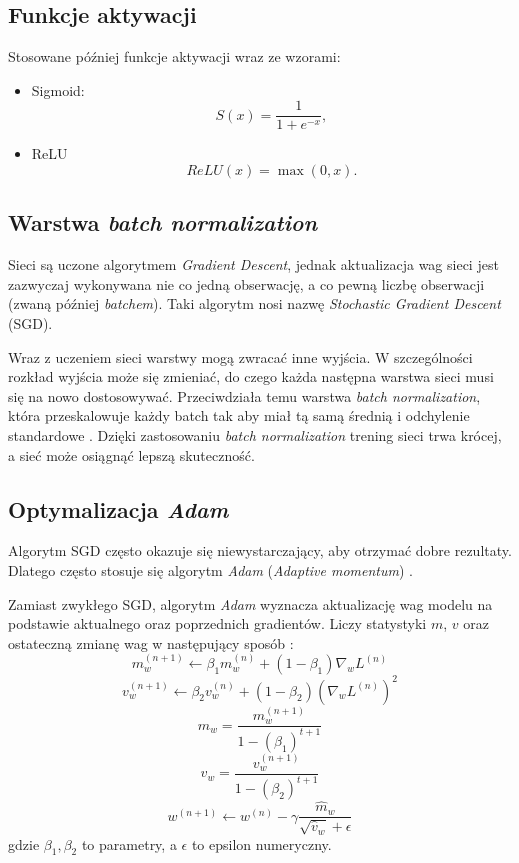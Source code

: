 \documentclass{pracalicmgr}
\begin{document}
	
	\subsection{Funkcje aktywacji}
	Stosowane później funkcje aktywacji wraz ze wzorami:
	\begin{itemize}
	\item Sigmoid: $$S(x) = \frac{1}{1+e^{-x}},$$
	\item ReLU\cite{relu} $$ReLU(x) = \max(0, x).$$
	\end{itemize}
	
	\subsection{Warstwa \textit{batch normalization}}
	Sieci są uczone algorytmem \textit{Gradient Descent}, jednak aktualizacja wag sieci jest zazwyczaj wykonywana nie co jedną obserwację, a co pewną liczbę obserwacji (zwaną później \textit{batchem}). Taki algorytm nosi nazwę \textit{Stochastic Gradient Descent} (SGD). 
	
	Wraz z uczeniem sieci warstwy mogą zwracać inne wyjścia. W szczególności rozkład wyjścia może się zmieniać, do czego każda następna warstwa sieci musi się na nowo dostosowywać. Przeciwdziała temu warstwa \textit{batch normalization}, która przeskalowuje każdy batch tak aby miał tą samą średnią i odchylenie standardowe \cite{batch_norm}. Dzięki zastosowaniu \textit{batch normalization} trening sieci trwa krócej, a sieć może osiągnąć lepszą skuteczność.
	
	\subsection{Optymalizacja \textit{Adam}}
	Algorytm SGD często okazuje się niewystarczający, aby otrzymać dobre rezultaty. Dlatego często stosuje się algorytm \textit{Adam} (\textit{Adaptive momentum}) \cite{adam}.
	
	Zamiast zwykłego SGD, algorytm \textit{Adam} wyznacza aktualizację wag modelu na podstawie aktualnego oraz poprzednich gradientów. Liczy statystyki $m$, $v$ oraz ostateczną zmianę wag w następujący sposób \cite{adam}:
	$${\displaystyle m_{w}^{(n+1)}\leftarrow \beta _{1}m_{w}^{(n)}+(1-\beta _{1})\nabla _{w}L^{(n)}}$$$$
{\displaystyle v_{w}^{(n+1)}\leftarrow \beta _{2}v_{w}^{(n)}+(1-\beta _{2})(\nabla _{w}L^{(n)})^{2}} $$$$
{\displaystyle {\hat {m}}_{w}={\frac {m_{w}^{(n+1)}}{1-(\beta _{1})^{t+1}}}}$$$$ {\displaystyle {\hat {v}}_{w}={\frac {v_{w}^{(n+1)}}{1-(\beta _{2})^{t+1}}}}$$$$
{\displaystyle w^{(n+1)}\leftarrow w^{(n)}-\gamma {\frac {{\hat {m}}_{w}}{{\sqrt {{\hat {v}}_{w}}}+\epsilon }}}$$ gdzie $\beta_1, \beta_2$ to parametry, a $\epsilon$ to epsilon numeryczny.
	
\end{document}
